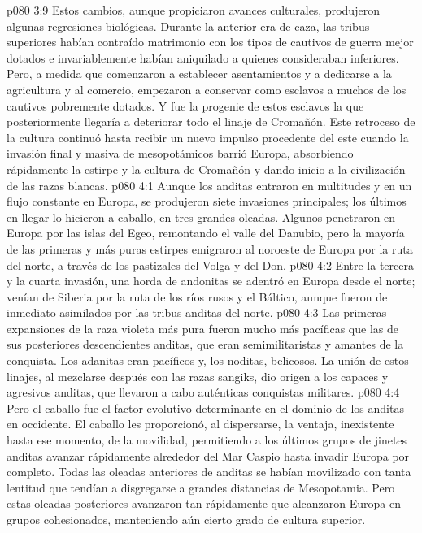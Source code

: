 \vs p080 3:9 Estos cambios, aunque propiciaron avances culturales, produjeron algunas regresiones biológicas. Durante la anterior era de caza, las tribus superiores habían contraído matrimonio con los tipos de cautivos de guerra mejor dotados e invariablemente habían aniquilado a quienes consideraban inferiores. Pero, a medida que comenzaron a establecer asentamientos y a dedicarse a la agricultura y al comercio, empezaron a conservar como esclavos a muchos de los cautivos pobremente dotados. Y fue la progenie de estos esclavos la que posteriormente llegaría a deteriorar todo el linaje de Cromañón. Este retroceso de la cultura continuó hasta recibir un nuevo impulso procedente del este cuando la invasión final y masiva de mesopotámicos barrió Europa, absorbiendo rápidamente la estirpe y la cultura de Cromañón y dando inicio a la civilización de las razas blancas.
\vs p080 4:1 Aunque los anditas entraron en multitudes y en un flujo constante en Europa, se produjeron siete invasiones principales; los últimos en llegar lo hicieron a caballo, en tres grandes oleadas. Algunos penetraron en Europa por las islas del Egeo, remontando el valle del Danubio, pero la mayoría de las primeras y más puras estirpes emigraron al noroeste de Europa por la ruta del norte, a través de los pastizales del Volga y del Don.
\vs p080 4:2 Entre la tercera y la cuarta invasión, una horda de andonitas se adentró en Europa desde el norte; venían de Siberia por la ruta de los ríos rusos y el Báltico, aunque fueron de inmediato asimilados por las tribus anditas del norte.
\vs p080 4:3 Las primeras expansiones de la raza violeta más pura fueron mucho más pacíficas que las de sus posteriores descendientes anditas, que eran semimilitaristas y amantes de la conquista. Los adanitas eran pacíficos y, los noditas, belicosos. La unión de estos linajes, al mezclarse después con las razas sangiks, dio origen a los capaces y agresivos anditas, que llevaron a cabo auténticas conquistas militares.
\vs p080 4:4 \pc Pero el caballo fue el factor evolutivo determinante en el dominio de los anditas en occidente. El caballo les proporcionó, al dispersarse, la ventaja, inexistente hasta ese momento, de la movilidad, permitiendo a los últimos grupos de jinetes anditas avanzar rápidamente alrededor del Mar Caspio hasta invadir Europa por completo. Todas las oleadas anteriores de anditas se habían movilizado con tanta lentitud que tendían a disgregarse a grandes distancias de Mesopotamia. Pero estas oleadas posteriores avanzaron tan rápidamente que alcanzaron Europa en grupos cohesionados, manteniendo aún cierto grado de cultura superior.
